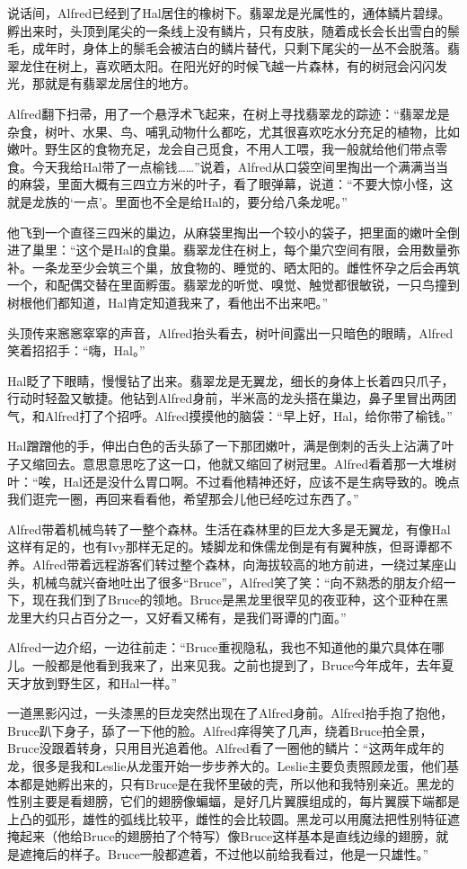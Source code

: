 \documentclass[../main.tex]{subfiles}
\begin{document}
说话间，Alfred已经到了Hal居住的橡树下。翡翠龙是光属性的，通体鳞片碧绿。孵出来时，头顶到尾尖的一条线上没有鳞片，只有皮肤，随着成长会长出雪白的鬃毛，成年时，身体上的鬃毛会被洁白的鳞片替代，只剩下尾尖的一丛不会脱落。翡翠龙住在树上，喜欢晒太阳。在阳光好的时候飞越一片森林，有的树冠会闪闪发光，那就是有翡翠龙居住的地方。

Alfred翻下扫帚，用了一个悬浮术飞起来，在树上寻找翡翠龙的踪迹：``翡翠龙是杂食，树叶、水果、鸟、哺乳动物什么都吃，尤其很喜欢吃水分充足的植物，比如嫩叶。野生区的食物充足，龙会自己觅食，不用人工喂，我一般就给他们带点零食。今天我给Hal带了一点榆钱\ldots\ldots''说着，Alfred从口袋空间里掏出一个满满当当的麻袋，里面大概有三四立方米的叶子，看了眼弹幕，说道：``不要大惊小怪，这就是龙族的`一点'。里面也不全是给Hal的，要分给八条龙呢。''

他飞到一个直径三四米的巢边，从麻袋里掏出一个较小的袋子，把里面的嫩叶全倒进了巢里：``这个是Hal的食巢。翡翠龙住在树上，每个巢穴空间有限，会用数量弥补。一条龙至少会筑三个巢，放食物的、睡觉的、晒太阳的。雌性怀孕之后会再筑一个，和配偶交替在里面孵蛋。翡翠龙的听觉、嗅觉、触觉都很敏锐，一只鸟撞到树根他们都知道，Hal肯定知道我来了，看他出不出来吧。''

头顶传来窸窸窣窣的声音，Alfred抬头看去，树叶间露出一只暗色的眼睛，Alfred笑着招招手：``嗨，Hal。''

Hal眨了下眼睛，慢慢钻了出来。翡翠龙是无翼龙，细长的身体上长着四只爪子，行动时轻盈又敏捷。他钻到Alfred身前，半米高的龙头搭在巢边，鼻子里冒出两团气，和Alfred打了个招呼。Alfred摸摸他的脑袋：``早上好，Hal，给你带了榆钱。''

Hal蹭蹭他的手，伸出白色的舌头舔了一下那团嫩叶，满是倒刺的舌头上沾满了叶子又缩回去。意思意思吃了这一口，他就又缩回了树冠里。Alfred看着那一大堆树叶：``唉，Hal还是没什么胃口啊。不过看他精神还好，应该不是生病导致的。晚点我们逛完一圈，再回来看看他，希望那会儿他已经吃过东西了。''

Alfred带着机械鸟转了一整个森林。生活在森林里的巨龙大多是无翼龙，有像Hal这样有足的，也有Ivy那样无足的。矮脚龙和侏儒龙倒是有有翼种族，但哥谭都不养。Alfred带着远程游客们转过整个森林，向海拔较高的地方前进，一绕过某座山头，机械鸟就兴奋地吐出了很多``Bruce''，Alfred笑了笑：``向不熟悉的朋友介绍一下，现在我们到了Bruce的领地。Bruce是黑龙里很罕见的夜亚种，这个亚种在黑龙里大约只占百分之一，又好看又稀有，是我们哥谭的门面。''

Alfred一边介绍，一边往前走：``Bruce重视隐私，我也不知道他的巢穴具体在哪儿。一般都是他看到我来了，出来见我。之前也提到了，Bruce今年成年，去年夏天才放到野生区，和Hal一样。''

一道黑影闪过，一头漆黑的巨龙突然出现在了Alfred身前。Alfred抬手抱了抱他，Bruce趴下身子，舔了一下他的脸。Alfred痒得笑了几声，绕着Bruce拍全景，Bruce没跟着转身，只用目光追着他。Alfred看了一圈他的鳞片：``这两年成年的龙，很多是我和Leslie从龙蛋开始一步步养大的。Leslie主要负责照顾龙蛋，他们基本都是她孵出来的，只有Bruce是在我怀里破的壳，所以他和我特别亲近。黑龙的性别主要是看翅膀，它们的翅膀像蝙蝠，是好几片翼膜组成的，每片翼膜下端都是上凸的弧形，雄性的弧线比较平，雌性的会比较圆。黑龙可以用魔法把性别特征遮掩起来（他给Bruce的翅膀拍了个特写）像Bruce这样基本是直线边缘的翅膀，就是遮掩后的样子。Bruce一般都遮着，不过他以前给我看过，他是一只雄性。''
\end{document}
